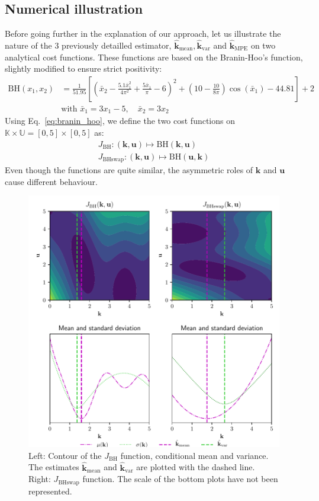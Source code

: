 \documentclass[preprint, 1p]{elsarticle}
\newcommand{\hatkmean}{\hat{\mathbf{k}}_{\mathrm{mean}}}
\newcommand{\hatkvar}{\hat{\mathbf{k}}_{\mathrm{var}}}
\newcommand{\hatkmpe}{\hat{\mathbf{k}}_{\mathrm{MPE}}}
\newcommand{\Kspace}{\mathbb{K}}
\newcommand{\Uspace}{\mathbb{U}}
\begin{document}
\subsection{Numerical illustration}
\label{ssec:num_illu}
Before going further in the explanation of our approach, let us illustrate the nature of the 3 previously detailled estimator, $\hatkmean, \hatkvar$ and $\hatkmpe$ on two analytical cost functions. These functions are based on the Branin-Hoo's function, slightly modified to ensure strict positivity:
\begin{align}
  \label{eq:branin_hoo}
 \mathrm{BH}(x_1,x_2) &= \frac{1}{51.95}\left[\left(\bar{x}_2 - \frac{5.1 \bar{x}_1^2}{4\pi^2} + \frac{5\bar{x}_1}{\pi} -6 \right)^2 + \left(10 - \frac{10}{8\pi}\right)\cos(\bar{x}_1)-44.81\right]+2\\
&\text{with } \bar{x}_1 = 3x_1-5,\quad \bar{x}_2 = 3x_2
\end{align}
%
Using Eq.~\eqref{eq:branin_hoo}, we define the two cost functions on $\Kspace \times \Uspace = [0,5] \times [0,5]$ as:
\begin{align*} J_{\mathrm{BH}} : (\mathbf{k},\mathbf{u}) \mapsto \mathrm{BH}(\mathbf{k},\mathbf{u}) \\
J_{\mathrm{BHswap}} : (\mathbf{k},\mathbf{u}) \mapsto \mathrm{BH}(\mathbf{u},\mathbf{k})
\end{align*}
Even though the functions are quite similar, the asymmetric roles of $\mathbf{k}$ and $\mathbf{u}$ cause different behaviour.


\begin{figure}[!ht]
  \centering
  \includegraphics[width=12cm]{Figures/branin_side_moments_noscale.pdf}
  \caption{Left: Contour of the $J_{\mathrm{BH}}$ function, conditional mean and variance. The estimates $\hatkmean$ and $\hatkvar$ are plotted with the dashed line. Right: $J_{\mathrm{BHswap}}$ function. The scale of the bottom plots have not been represented.} %
\label{fig:branin_moments}
\end{figure}
\end{document}

